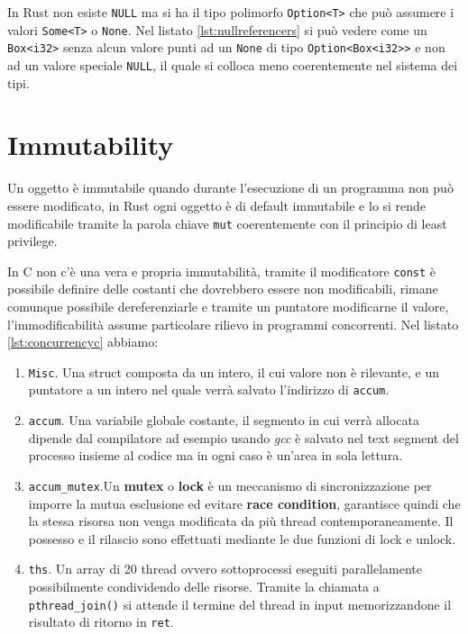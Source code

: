 \documentclass[Lau,binding=0.6cm]{sapthesis}
\newcommand{\textcode}[1]{\colorbox{backcolour}{\texttt{#1}}}
\begin{document}
In Rust non esiste \textcode{NULL} ma si ha il tipo polimorfo \textcode{Option<T>} che può assumere i valori \textcode{Some<T>} o \textcode{None}. 
Nel listato \ref{lst:nullreferencers} si può vedere come un \texttt{Box<i32>} senza alcun valore punti ad un \textcode{None} di tipo \textcode{Option<Box<i32>{}>} e non ad un valore speciale \textcode{NULL}, il quale si colloca meno coerentemente nel sistema dei tipi.




\section{Immutability}
Un oggetto è immutabile quando durante l'esecuzione di un programma non può essere modificato, in Rust ogni oggetto è di default immutabile e lo si rende modificabile tramite la parola chiave \textcode{mut} coerentemente con il principio di least privilege.

In C non c'è una vera e propria immutabilità, tramite il modificatore \texttt{const} è possibile definire delle costanti che dovrebbero essere non modificabili, rimane comunque possibile dereferenziarle e tramite un puntatore modificarne il valore, l'immodificabilità assume particolare rilievo in programmi concorrenti. 
Nel listato \ref{lst:concurrencyc} abbiamo:
\begin{enumerate}
    \item \textcode{Misc}. Una struct composta da un intero, il cui valore non è rilevante, e un puntatore a un intero nel quale verrà salvato l'indirizzo di \textcode{accum}. 
    \item \textcode{accum}. Una variabile globale costante, il segmento in cui verrà allocata dipende dal compilatore ad esempio usando \textit{gcc} è salvato nel text segment del processo insieme al codice ma in ogni caso è un'area in sola lettura.
    \item \textcode{accum\_mutex}.Un \textbf{mutex} o \textbf{lock} è un meccanismo di sincronizzazione per imporre la mutua esclusione ed evitare \textbf{race condition}, garantisce quindi che la stessa risorsa non venga modificata da più thread contemporaneamente.
    Il possesso e il rilascio sono effettuati mediante le due funzioni di lock e unlock.
    \item \texttt{ths}. Un array di 20 thread ovvero sottoprocessi eseguiti parallelamente possibilmente condividendo delle risorse.
    Tramite la chiamata a \textcode{pthread\_join()} si attende il termine del thread in input memorizzandone il risultato di ritorno in \textcode{ret}. 
\end{enumerate}
\end{document}
